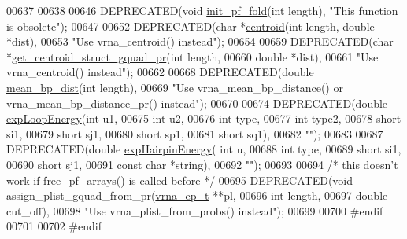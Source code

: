 \begin{DoxyCode}
00637 
00638 
00646 DEPRECATED(\textcolor{keywordtype}{void} \hyperlink{group__part__func__global__deprecated_ga15176e23eceeff8c7d14eabcfec8a2af}{init\_pf\_fold}(\textcolor{keywordtype}{int} length), \textcolor{stringliteral}{"This function is obsolete"});
00647 
00652 DEPRECATED(\textcolor{keywordtype}{char} *\hyperlink{part__func_8h_ae89a63bd83e75a80b2ba36d20b31ce81}{centroid}(\textcolor{keywordtype}{int} length, \textcolor{keywordtype}{double} *dist),
00653 \textcolor{stringliteral}{"Use vrna\_centroid() instead"});
00654 
00659 DEPRECATED(\textcolor{keywordtype}{char} *\hyperlink{part__func_8h_a4e99e951dfdc006fe56c3a59374378ed}{get\_centroid\_struct\_gquad\_pr}(\textcolor{keywordtype}{int} length,
00660                                   \textcolor{keywordtype}{double} *dist),
00661 \textcolor{stringliteral}{"Use vrna\_centroid() instead"});
00662 
00668 DEPRECATED(\textcolor{keywordtype}{double} \hyperlink{part__func_8h_ae9556ba7ded44fe2321b6f67c3fc02a3}{mean\_bp\_dist}(\textcolor{keywordtype}{int} length),
00669 \textcolor{stringliteral}{"Use vrna\_mean\_bp\_distance() or vrna\_mean\_bp\_distance\_pr() instead"});
00670 
00674 DEPRECATED(\textcolor{keywordtype}{double} \hyperlink{part__func_8h_a68ba6f3a48e08ca131ab54621ce3a2d7}{expLoopEnergy}(\textcolor{keywordtype}{int} u1,
00675                                 \textcolor{keywordtype}{int} u2,
00676                                 \textcolor{keywordtype}{int} type,
00677                                 \textcolor{keywordtype}{int} type2,
00678                                 \textcolor{keywordtype}{short} si1,
00679                                 \textcolor{keywordtype}{short} sj1,
00680                                 \textcolor{keywordtype}{short} sp1,
00681                                 \textcolor{keywordtype}{short} sq1),
00682 \textcolor{stringliteral}{""});
00683 
00687 DEPRECATED(\textcolor{keywordtype}{double} \hyperlink{part__func_8h_a7b6ab474cc80accc48010ccfcc59f96b}{expHairpinEnergy}( \textcolor{keywordtype}{int} u,
00688                                     \textcolor{keywordtype}{int} type,
00689                                     \textcolor{keywordtype}{short} si1,
00690                                     \textcolor{keywordtype}{short} sj1,
00691                                     \textcolor{keyword}{const} \textcolor{keywordtype}{char} *\textcolor{keywordtype}{string}),
00692 \textcolor{stringliteral}{""});
00693 
00694 \textcolor{comment}{/* this doesn't work if free\_pf\_arrays() is called before */}
00695 DEPRECATED(\textcolor{keywordtype}{void} assign\_plist\_gquad\_from\_pr(\hyperlink{group__struct__utils__plist_structvrna__elem__prob__s}{vrna\_ep\_t} **pl,
00696                                 \textcolor{keywordtype}{int} length,
00697                                 \textcolor{keywordtype}{double} cut\_off),
00698 \textcolor{stringliteral}{"Use vrna\_plist\_from\_probs() instead"});
00699 
00700 \textcolor{preprocessor}{#endif}
00701 
00702 \textcolor{preprocessor}{#endif}
\end{DoxyCode}
